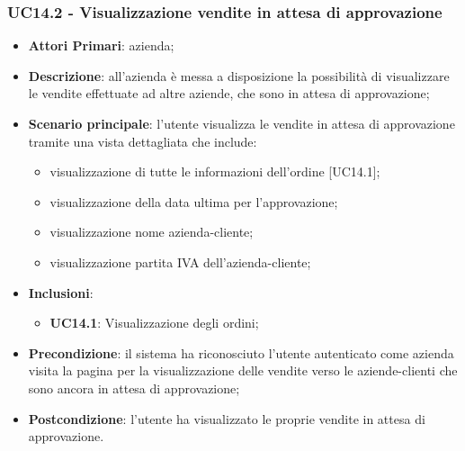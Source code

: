 \subsubsection{UC14.2 - Visualizzazione vendite in attesa di approvazione}
\begin{itemize}
	\item \textbf{Attori Primari}: azienda;
	\item \textbf{Descrizione}: all'azienda è messa a disposizione la possibilità di visualizzare le vendite effettuate ad altre aziende, che sono in attesa di approvazione;
	\item \textbf{Scenario principale}: l'utente visualizza le vendite in attesa di approvazione tramite una vista dettagliata che include: 
		\begin{itemize}
		\item visualizzazione di tutte le informazioni dell'ordine [UC14.1];
		\item visualizzazione della data ultima per l'approvazione;
		\item visualizzazione nome azienda-cliente;
		\item visualizzazione partita IVA dell'azienda-cliente;
		\end{itemize}
		\item \textbf{Inclusioni}:
	\begin{itemize}
		\item \textbf{UC14.1}: Visualizzazione degli ordini;
	\end{itemize}
	\item \textbf{Precondizione}: il sistema ha riconosciuto l'utente autenticato come azienda visita la pagina per la visualizzazione delle vendite verso le aziende-clienti che sono ancora in attesa di approvazione;
	\item \textbf{Postcondizione}: l'utente ha visualizzato le proprie vendite in attesa di approvazione.
\end{itemize} 

